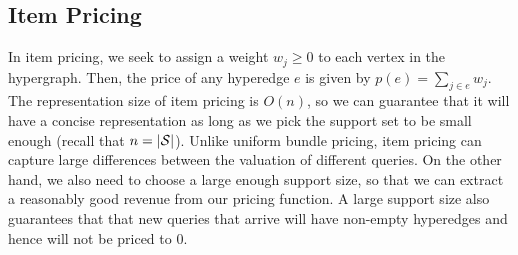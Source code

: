

%


\subsection{Item Pricing} 

In item pricing, we seek to assign a weight $w_j \geq 0$ to each vertex in the hypergraph. 
Then, the price of any hyperedge $e$ is given by $p(e) = \sum_{j \in e} w_j$. The representation size of item pricing is $O(n)$, so we can guarantee that it will have a 
concise representation as long as we pick the support set to be small enough (recall that $n = |\mathcal{S}|$). Unlike uniform bundle pricing, item pricing can capture large differences between
the valuation of different queries. On the other hand, we also need to choose a large enough support size, so that we can extract a reasonably good revenue from our pricing
function. A large support size also guarantees that that new queries that arrive will have
non-empty hyperedges and hence will not be priced to 0. 

